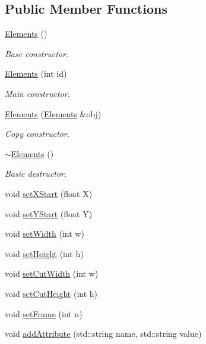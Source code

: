 \subsection*{Public Member Functions}
\begin{DoxyCompactItemize}
\item 
\hyperlink{class_elements_aaf76c70282b6997fc20f1d8c751d7146}{Elements} ()
\begin{DoxyCompactList}\small\item\em Base constructor. \end{DoxyCompactList}\item 
\hyperlink{class_elements_a15505a7088b59b169943cf0b3883d859}{Elements} (int id)
\begin{DoxyCompactList}\small\item\em Main constructor. \end{DoxyCompactList}\item 
\hyperlink{class_elements_a2a0658f7634191593c7d6eeab1556adc}{Elements} (\hyperlink{class_elements}{Elements} \&obj)
\begin{DoxyCompactList}\small\item\em Copy constructor. \end{DoxyCompactList}\item 
\hyperlink{class_elements_a28037b21a12317e69d6160da9f4844de}{$\sim$\-Elements} ()
\begin{DoxyCompactList}\small\item\em Basic destructor. \end{DoxyCompactList}\item 
void \hyperlink{class_elements_a23add0eda070fb51f84eab6b94d5b886}{set\-X\-Start} (float X)
\item 
void \hyperlink{class_elements_a2214c37dc1288a3763db6780bf7d6ee5}{set\-Y\-Start} (float Y)
\item 
void \hyperlink{class_elements_a16f6accfe5a20c996dae8154132e4bf7}{set\-Width} (int w)
\item 
void \hyperlink{class_elements_ad778acde74a8640958c6db2b7dd782bc}{set\-Height} (int h)
\item 
void \hyperlink{class_elements_ad82fc7032101163c452a9469a095acab}{set\-Cut\-Width} (int w)
\item 
void \hyperlink{class_elements_a58ffc59bb3226e252ca50bdc67db46b5}{set\-Cut\-Height} (int h)
\item 
void \hyperlink{class_elements_a9ba8c94a6f92d510d60b51239a42b67c}{set\-Frame} (int n)
\item 
void \hyperlink{class_elements_a4aac83563af945cf6c05af4e4d6a173b}{add\-Attribute} (std\-::string name, std\-::string value)

\end{DoxyCompactItemize}
